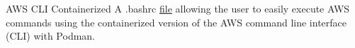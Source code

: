 \datedsubsectionnarrow{}
{AWS CLI Containerized}{}
{A .bashrc \href{https://github.com/JacobArchambault/aws-cli-container-shortcut-with-podman}{file} allowing the user to easily execute AWS commands using the containerized version of the AWS command line interface (CLI) with Podman.}